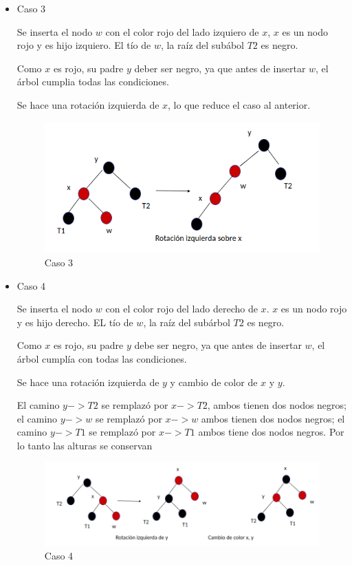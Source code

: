\documentclass[11pt]{article}
\begin{document}
\begin{itemize}
\begin{itemize}
\item Caso 3

Se inserta el nodo $w$ con el color rojo del lado izquiero de $x$, $x$ es un nodo rojo y es hijo izquiero. El tío de $w$, la raíz del subábol $T2$ es negro.

Como $x$ es rojo, su padre $y$ deber ser negro, ya que antes de insertar $w$, el árbol cumplia todas las condiciones.

Se hace una rotación izquierda de $x$, lo que reduce el caso al anterior.
\begin{figure}[H]
\begin{center}
\includegraphics[scale=0.5]{caso3.png}
\caption{Caso 3}
\end{center}
\end{figure}

\item Caso 4

Se inserta el nodo $w$ con el color rojo del lado derecho de $x$. $x$ es un nodo rojo y es hijo derecho. EL tío de $w$, la raíz del subárbol $T2$ es negro.

Como $x$ es rojo, su padre $y$ debe ser negro, ya que antes de insertar $w$, el árbol cumplía con todas las condiciones.

Se hace una rotación izquierda de $y$ y cambio de color de $x$ y $y$.

El camino $y->T2$ se remplazó por $x->T2$, ambos tienen dos nodos negros; el camino $y->w$ se remplazó por $x->w$ ambos tienen dos nodos negros; el camino $y->T1$ se remplazó por $x->T1$ ambos tiene dos nodos negros. 
Por lo tanto las alturas se conservan 
\begin{figure}[H]
\begin{center}
\includegraphics[scale=0.5]{caso4.png}
\caption{Caso 4}
\end{center}
\end{figure}


\end{itemize}
\end{itemize}
\end{document}
